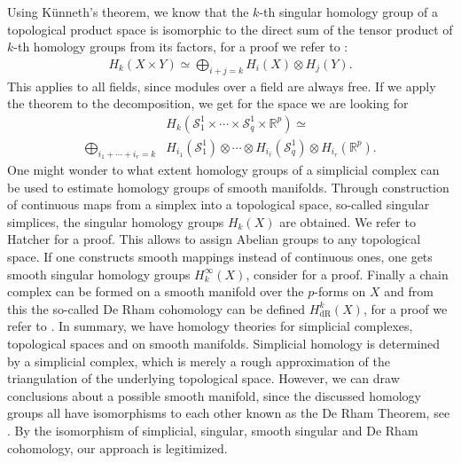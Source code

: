 \documentclass[runningheads,orivec]{llncs}
\begin{document}
Using Künneth's theorem, we know that the $k$-th singular homology group of a topological product space is isomorphic to the direct sum of the tensor product of $k$-th homology groups from its factors, for a proof we refer to \cite[p.~268]{hatcher2002algebraic}:
\begin{align}
    H_k(X \times Y) \simeq \bigoplus_{i+j=k}H_i(X) \otimes H_j(Y).
\end{align}
This applies to all fields, since modules over a field are always free. If we apply the theorem to the decomposition, we get for the space we are looking for
\begin{align}
    \label{homologykunneth}
    &H_k(\mathcal{S}^{1}_{1}\times\cdots\times \mathcal{S}^{1}_{q}\times\mathbb{R}^p) \simeq \\
    \bigoplus_{i_{1} + \cdots + i_{r}=k} &H_{i_{1}}(\mathcal{S}^{1}_{1}) \otimes \cdots \otimes H_{i_{\hat{r}}}(\mathcal{S}^{1}_{q}) \otimes H_{i_{r}}(\mathbb{R}^{p}).
\end{align}
One might wonder to what extent homology groups of a simplicial complex can be used to estimate homology groups of smooth manifolds. Through construction of continuous maps from a simplex into a topological space, so-called singular simplices, the singular homology groups $H_{k}(X)$ are obtained. We refer to Hatcher \cite[p.~102]{hatcher2002algebraic} for a proof. This allows to assign Abelian groups to any topological space. If one constructs smooth mappings instead of continuous ones, one gets smooth singular homology groups $H^{\infty}_{k}(X)$, consider \cite[pp.~473]{lee2013smooth} for a proof. Finally a chain complex can be formed on a smooth manifold over the $p$-forms on $X$ and from this the so-called De Rham cohomology can be defined $H_{\text{dR}}^{k}(X)$, for a proof we refer to \cite[pp.~440]{lee2013smooth}. In summary, we have homology theories for simplicial complexes, topological spaces and on smooth manifolds. Simplicial homology is determined by a simplicial complex, which is merely a rough approximation of the triangulation of the underlying topological space. However, we can draw conclusions about a possible smooth manifold, since the discussed homology groups all have isomorphisms to each other known as the De Rham Theorem, see \cite[pp.~106, pp.~467]{hatcher2002algebraic,lee2013smooth}. By the isomorphism of simplicial, singular, smooth singular and De Rham cohomology, our approach is legitimized.
\end{document}
